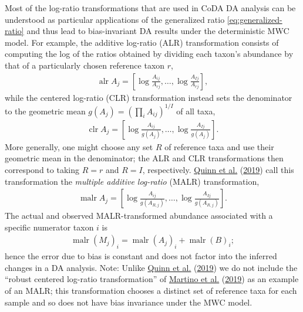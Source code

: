 \documentclass[
]{article}
\theoremstyle{definition}
\theoremstyle{definition}
\theoremstyle{definition}
\theoremstyle{definition}
\theoremstyle{remark}
\begin{document}
Most of the log-ratio transformations that are used in CoDA DA analysis can be understood as particular applications of the generalized ratio \eqref{eq:generalized-ratio} and thus lead to bias-invariant DA results under the deterministic MWC model.
For example, the additive log-ratio (ALR) transformation consists of computing the log of the ratios obtained by dividing each taxon's abundance by that of a particularly chosen reference taxon \(r\),
\begin{align}
  \label{eq:alr}
  \operatorname{alr} A_{j} = \left[ \log \frac{A_{ij}}{A_{rj}}, \dots, \log \frac{A_{Ij}}{A_{rj}} \right],
\end{align}
while the centered log-ratio (CLR) transformation instead sets the denominator to the geometric mean \(g(A_j) = \left(\prod_i A_{ij}\right)^{1/I}\) of all taxa,
\begin{align}
  \label{eq:clr}
  \operatorname{clr} A_{j} = \left[ \log \frac{A_{ij}}{g(A_{j})}, \dots, \log \frac{A_{Ij}}{g(A_{j})} \right].
\end{align}
More generally, one might choose any set \(R\) of reference taxa and use their geometric mean in the denominator;
the ALR and CLR transformations then correspond to taking \(R=r\) and \(R=I\), respectively.
\protect\hyperlink{ref-quinn2019afie}{Quinn et al.} (\protect\hyperlink{ref-quinn2019afie}{2019}) call this transformation the \emph{multiple additive log-ratio} (MALR) transformation,
\begin{align}
  \label{eq:malr}
  \operatorname{malr} A_{j} = \left[ \log \frac{A_{ij}}{g(A_{R,j})}, \dots, \log \frac{A_{Ij}}{g(A_{R,j})} \right].
\end{align}
The actual and observed MALR-transformed abundance associated with a specific numerator taxon \(i\) is
\begin{align}
  \label{eq:malr-error}
  \operatorname{malr}(M_{j})_i = \operatorname{malr}(A_{j})_i + \operatorname{malr}(B)_i;
\end{align}
hence the error due to bias is constant and does not factor into the inferred changes in a DA analysis.
Note: Unlike \protect\hyperlink{ref-quinn2019afie}{Quinn et al.} (\protect\hyperlink{ref-quinn2019afie}{2019}) we do not include the ``robust centered log-ratio transformation'' of \protect\hyperlink{ref-martino2019anov}{Martino et al.} (\protect\hyperlink{ref-martino2019anov}{2019}) as an example of an MALR; this transformation chooses a distinct set of reference taxa for each sample and so does not have bias invariance under the MWC model.
\end{document}
